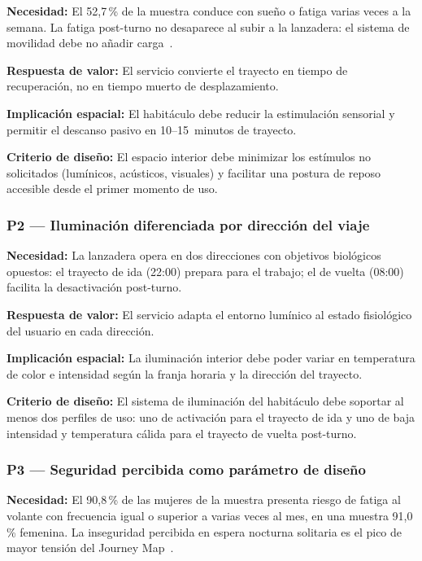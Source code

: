 \textbf{Necesidad:} El 52,7\,\% de la muestra conduce con sueño
o fatiga varias veces a la semana. La fatiga post-turno no
desaparece al subir a la lanzadera: el sistema de movilidad debe
no añadir carga~\parencite{LouridoRegueira2026}.

\textbf{Respuesta de valor:} El servicio convierte el trayecto
en tiempo de recuperación, no en tiempo muerto de desplazamiento.

\textbf{Implicación espacial:} El habitáculo debe reducir la
estimulación sensorial y permitir el descanso pasivo en
10--15~minutos de trayecto.

\textbf{Criterio de diseño:} El espacio interior debe minimizar
los estímulos no solicitados (lumínicos, acústicos, visuales)
y facilitar una postura de reposo accesible desde el primer
momento de uso.


\subsubsection{P2 — Iluminación diferenciada por dirección del viaje}
\label{sec:p2-iluminacion}

\textbf{Necesidad:} La lanzadera opera en dos direcciones con
objetivos biológicos opuestos: el trayecto de ida (22:00) prepara
para el trabajo; el de vuelta (08:00) facilita la
desactivación post-turno.

\textbf{Respuesta de valor:} El servicio adapta el entorno
lumínico al estado fisiológico del usuario en cada dirección.

\textbf{Implicación espacial:} La iluminación interior debe poder
variar en temperatura de color e intensidad según la franja
horaria y la dirección del trayecto.

\textbf{Criterio de diseño:} El sistema de iluminación del
habitáculo debe soportar al menos dos perfiles de uso: uno de
activación para el trayecto de ida y uno de baja intensidad y
temperatura cálida para el trayecto de vuelta post-turno.


\subsubsection{P3 — Seguridad percibida como parámetro de diseño}
\label{sec:p3-seguridad}

\textbf{Necesidad:} El 90,8\,\% de las mujeres de la muestra
presenta riesgo de fatiga al volante con frecuencia igual o
superior a varias veces al mes, en una muestra 91,0\,\% femenina.
La inseguridad percibida en espera nocturna solitaria es el
pico de mayor tensión del Journey Map~\parencite{LouridoRegueira2026}.

